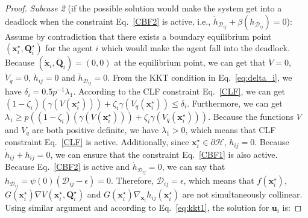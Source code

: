 \documentclass[letterpaper, 10 pt, conference]{ieeeconf}
\theoremstyle{plain}
\begin{document}
\begin{proof}
\textit{Subcase 2} (if the possible solution would make the system get into a deadlock when the constraint Eq.~\eqref{CBF2} is active, i.e., $\dot{h}_{\mathcal{D}_{ij}} + \beta(h_{\mathcal{D}_{ij}}) = 0$):
Assume by contradiction that there exists a boundary equilibrium point $(\mathbf{x}_i^{\star}, \mathbf{Q}_i^{\star})$ for the agent $i$ which would make the agent fall into the deadlock. Because $(\dot{\mathbf{x}}_i, \dot{\mathbf{Q}}_i) = (0,0)$ at the equilibrium point, we can get that $\dot{V} = 0$, $\dot{V}_q = 0$, $\dot{h}_{ij} = 0$ and $\dot{h}_{\mathcal{D}_{ij}} = 0$. From the KKT condition in Eq.~\eqref{eq:delta_i}, we have $\delta_i =0.5 p^{-1} \lambda_1$. According to the CLF constraint Eq.~\eqref{CLF}, we can get $(1-\zeta_i)(\gamma(V(\mathbf{x}_i^{\star}))) + \zeta_i \gamma(V_q(\mathbf{x}_i^{\star})) \leq \delta_i$. Furthermore, we can get $\lambda_1 \geq p((1-\zeta_i)(\gamma(V(\mathbf{x}_i^{\star}))) + \zeta_i \gamma(V_q(\mathbf{x}_i^{\star})))$.
Because the functions $V$ and $V_q$ are both positive definite, we have $\lambda_1 > 0$, which means that CLF constraint Eq.~\eqref{CLF} is active. Additionally, since $\mathbf{x}_i^{\star} \in \partial \mathcal{H}$, 
$h_{ij} = 0$. Because $\dot{h}_{ij} + h_{ij} = 0$, we can ensure that the constraint Eq.~\eqref{CBF1} is also active. 
Because Eq.~\eqref{CBF2} is active and $\dot{h}_{\mathcal{D}_{ij}} = 0$, we can say that $h_{\mathcal{D}_{ij}} = \psi(0)(\mathcal{D}_{ij} - \epsilon) = 0$. Therefore, $\mathcal{D}_{ij} = \epsilon$, which means that $f(\mathbf{x}_i^{\star})$, $G(\mathbf{x}_i^{\star})\nabla V(\mathbf{x}_i^{\star}, \mathbf{Q}_i^{\star})$ and $G(\mathbf{x}_i^{\star})\nabla_{\mathbf{x}_i} h_{ij}(\mathbf{x}_i^{\star})$ are not simultaneously collinear. Using similar argument \cite{reis2020control} and according to Eq.~\eqref{eq:kkt1}, the solution for $\mathbf{u}_i$ is:


\end{proof}
\end{document}
